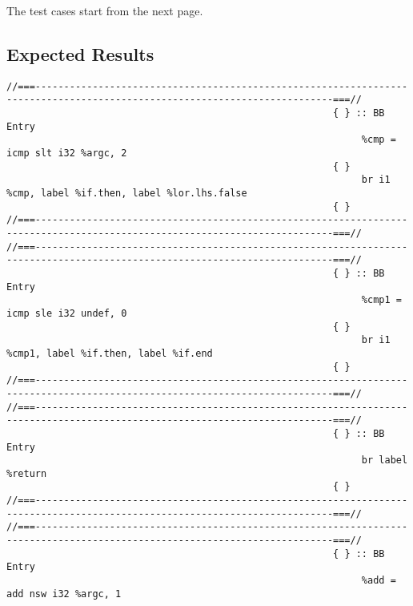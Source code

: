 The test cases start from the next page.



\subsection{Expected Results}

\begingroup
\fontsize{6pt}{8pt}\selectfont
\begin{verbatim}
//===--------------------------------------------------------------------------------------------------------------------------===//
                                                         { } :: BB Entry
                                                              %cmp = icmp slt i32 %argc, 2
                                                         { }
                                                              br i1 %cmp, label %if.then, label %lor.lhs.false
                                                         { }
//===--------------------------------------------------------------------------------------------------------------------------===//
//===--------------------------------------------------------------------------------------------------------------------------===//
                                                         { } :: BB Entry
                                                              %cmp1 = icmp sle i32 undef, 0
                                                         { }
                                                              br i1 %cmp1, label %if.then, label %if.end
                                                         { }
//===--------------------------------------------------------------------------------------------------------------------------===//
//===--------------------------------------------------------------------------------------------------------------------------===//
                                                         { } :: BB Entry
                                                              br label %return
                                                         { }
//===--------------------------------------------------------------------------------------------------------------------------===//
//===--------------------------------------------------------------------------------------------------------------------------===//
                                                         { } :: BB Entry
                                                              %add = add nsw i32 %argc, 1

\end{verbatim}

